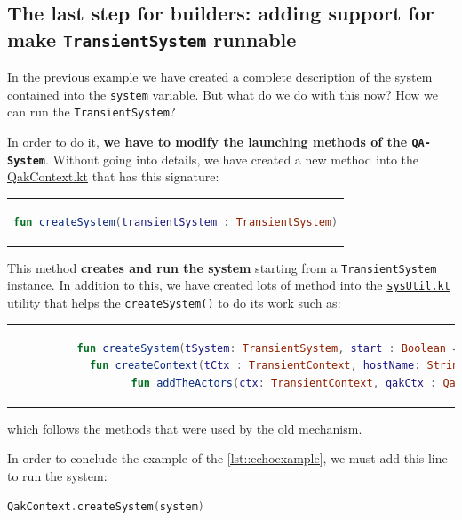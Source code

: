 \subsection{The last step for builders: adding support for make \texttt{TransientSystem} runnable}

In the previous example we have created a complete description of the system contained into the \verb*|system| variable. But what do we do with this now? How we can run the \texttt{TransientSystem}?

In order to do it, \textbf{we have to modify the launching methods of the \texttt{QA-System}}.
Without going into details, we have created a new method into the \href{https://github.com/LM-96/QA-Extensions/blob/main/it.unibo.qakactor/src/main/kotlin/QakContext.kt}{QakContext.kt} that has this signature:

\begin{center}
	\begin{tabular}{c}
		\begin{lstlisting}[frame=none,numbers=none,language=Kotlin]
			fun createSystem(transientSystem : TransientSystem)
		\end{lstlisting}
	\end{tabular}
\end{center}

This method \textcolor{BrickRed}{\textbf{creates and run the system}} starting from a \texttt{TransientSystem} instance.
In addition to this, we have created lots of method into the \href{https://github.com/LM-96/QA-Extensions/blob/main/it.unibo.qakactor/src/main/kotlin/sysUtil.kt}{\texttt{sysUtil.kt}} utility that helps the \verb|createSystem()| to do its work such as:
\begin{center}
	\begin{tabular}{c}
		\begin{lstlisting}[frame=none,numbers=none,language=Kotlin]
			fun createSystem(tSystem: TransientSystem, start : Boolean = true)
			fun createContext(tCtx : TransientContext, hostName: String) : QakContext?
			fun addTheActors(ctx: TransientContext, qakCtx : QakContext )
		\end{lstlisting}
	\end{tabular}
\end{center}
which follows the methods that were used by the old mechanism.

In order to conclude the example of the \ref{lst::echoexample}, we must add this line to run the system:
\begin{lstlisting}[language=Kotlin]
	QakContext.createSystem(system)
\end{lstlisting}


